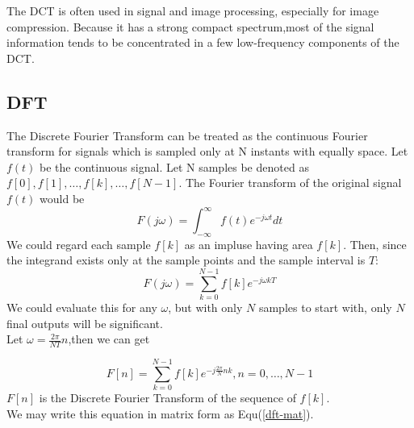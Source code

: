 \documentclass[journal,comsoc]{IEEEtran}
\begin{document}
The DCT is often used in signal and image processing, especially for image compression.
Because it has a strong compact spectrum,most of the signal information tends to be concentrated
in a few low-frequency components of the DCT. 

\subsection{DFT}
\label{subsec:sub-dft}
The Discrete Fourier Transform can be treated as the continuous Fourier transform for signals which
is sampled only at N instants with equally space. Let $f(t)$ be the continuous signal. Let N samples
be denoted as $f[0],f[1],\dots,f[k],\dots,f[N-1]$.
The Fourier transform of the original signal $f(t)$ would be
$$F(j\omega)=\int_{-\infty}^{\infty}f(t)e^{-j\omega{t}}dt$$
We could regard each sample $f[k]$ as an impluse having area $f[k]$. Then, since the integrand exists only at
the sample points and the sample interval is $T$:
$$F(j\omega)=\sum_{k=0}^{N-1}f[k]e^{-j\omega{kT}}$$
We could evaluate this for any $\omega$, but with only $N$ samples to start with, only $N$ final outputs will
be significant.\\
Let $\omega=\frac{2\pi}{NT}n$,then we can get


\begin{equation}
  \label{dft-equation}
  F[n]=\sum_{k=0}^{N-1}f[k]e^{-j\frac{2\pi}{N}nk},n=0,\dots,N-1
\end{equation}
$F[n]$ is the Discrete Fourier Transform of the sequence of $f[k]$.\\
We may write this equation in matrix form as Equ(\ref{dft-mat}).
\end{document}
